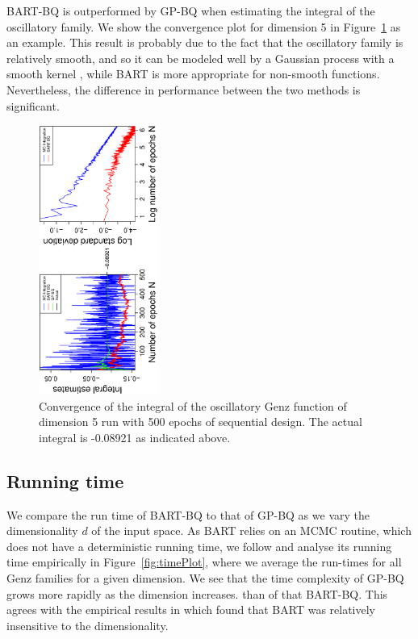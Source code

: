 BART-BQ is outperformed by GP-BQ when estimating the integral of the oscillatory family. We show the convergence plot for dimension 5 in Figure~\ref{fig:genz3} as an example. This result is probably due to the fact that the oscillatory family is relatively smooth, and so it can be modeled well by a Gaussian process with a smooth kernel  \cite{10.2307/25464673}, while BART is more appropriate for non-smooth functions. Nevertheless, the difference in performance between the two methods is significant.

\begin{figure}[!ht]
\centering
\vspace*{-8mm}
\includegraphics[width = 0.35\textwidth, angle = -90]{../../report/Figures/5/convergenceMean55Dimensions.eps}
\vspace*{-5mm}
\caption{Convergence of the integral of the oscillatory Genz function of dimension 5 run with 500 epochs of sequential design. The actual integral is -0.08921 as indicated above.}
\label{fig:genz3}
\vspace*{-1mm}
\end{figure}

\subsection{Running time}
We compare the run time of BART-BQ to that of GP-BQ as we vary the dimensionality $d$ of the input space. As BART relies on an MCMC routine, which does not have a deterministic running time, we follow \cite{BART} and analyse its running time empirically in Figure~\ref{fig:timePlot}, where we average the run-times for all Genz families for a given dimension. We see that the time complexity of GP-BQ grows more rapidly as the dimension increases. than of that BART-BQ. This agrees with the empirical results in \cite{BART} which found that BART was relatively insensitive to the dimensionality.

